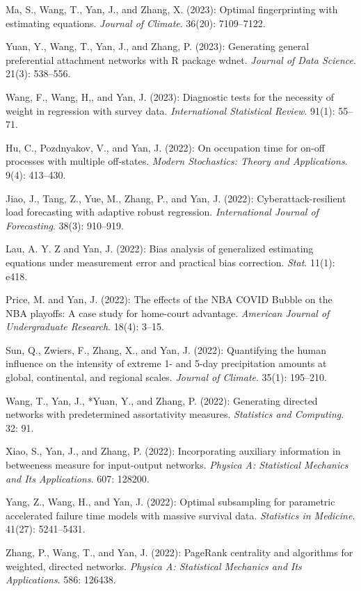 \documentclass[Statistics]{vita}
\begin{document}
\begin{vita}
\begin{Publications}
\begin{RefereedJournalArticles}
   \item *Ma, S., Wang, T., Yan, J., and Zhang, X. (2023): Optimal fingerprinting with estimating equations. {\em Journal of Climate\/}. 36(20): 7109--7122.
  \item *Yuan, Y., Wang, T., Yan, J., and Zhang, P. (2023): Generating general preferential attachment networks with R package {wdnet}. {\em Journal of Data Science\/}. 21(3): 538--556.
  \item *Wang, F., Wang, H,, and Yan, J. (2023): Diagnostic tests for the necessity of weight in regression with survey data. {\em International Statistical Review\/}. 91(1): 55--71.
  \item *Hu, C., Pozdnyakov, V., and Yan, J. (2022): On occupation time for on-off processes with multiple off-states. {\em Modern Stochastics: Theory and Applications\/}. 9(4): 413--430.
  \item *Jiao, J., Tang, Z., Yue, M., Zhang, P., and Yan, J. (2022): Cyberattack-resilient load forecasting with adaptive robust regression. {\em International Journal of Forecasting\/}. 38(3): 910--919.
  \item *Lau, A. Y. Z and Yan, J. (2022): Bias analysis of generalized estimating equations under measurement error and practical bias correction. {\em Stat\/}. 11(1): e418.
  \item *Price, M. and Yan, J. (2022): The effects of the NBA COVID Bubble on the NBA playoffs: A case study for home-court advantage. {\em American Journal of Undergraduate Research\/}. 18(4): 3--15.
  \item Sun, Q., Zwiers, F., Zhang, X., and Yan, J. (2022): Quantifying the human influence on the intensity of extreme 1- and 5-day precipitation amounts at global, continental, and regional scales. {\em Journal of Climate\/}. 35(1): 195--210.
  \item Wang, T., Yan, J., *Yuan, Y., and Zhang, P. (2022): Generating directed networks with predetermined assortativity measures. {\em Statistics and Computing}. 32: 91.
  \item *Xiao, S., Yan, J., and Zhang, P. (2022): Incorporating auxiliary information in betweeness measure for input-output networks. {\em Physica A: Statistical Mechanics and Its Applications\/}. 607: 128200.
  \item *Yang, Z., Wang, H., and Yan, J. (2022): Optimal subsampling for parametric accelerated failure time models with massive survival data. {\em Statistics in Medicine}. 41(27): 5241--5431.
  \item Zhang, P., Wang, T., and Yan, J. (2022): PageRank centrality and algorithms for weighted, directed networks. {\em Physica A: Statistical Mechanics and Its Applications\/}. 586: 126438.

\end{RefereedJournalArticles}
\end{Publications}
\end{vita}
\end{document}
